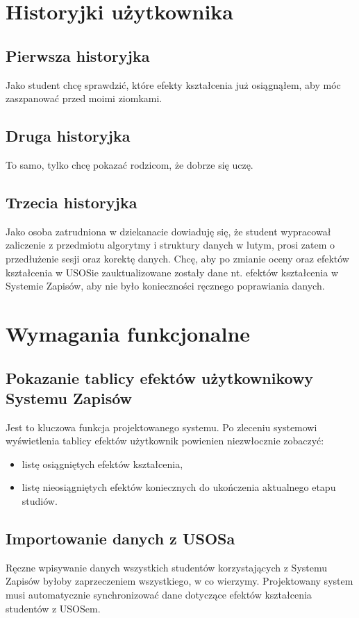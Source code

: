 \documentclass{article}
\begin{document}
\section{Historyjki użytkownika}

\subsection{Pierwsza historyjka}
Jako student chcę sprawdzić, które efekty kształcenia już osiągnąłem, aby móc zaszpanować przed moimi ziomkami.

\subsection{Druga historyjka} %
To samo, tylko chcę pokazać rodzicom, że dobrze się uczę.

\subsection{Trzecia historyjka}
Jako osoba zatrudniona w dziekanacie dowiaduję się, że student wypracował zaliczenie z przedmiotu algorytmy i struktury danych w lutym, prosi zatem o przedłużenie sesji oraz korektę danych. Chcę, aby po zmianie oceny oraz efektów kształcenia w USOSie zauktualizowane zostały dane nt. efektów kształcenia w Systemie Zapisów, aby nie było konieczności ręcznego poprawiania danych.



\section{Wymagania funkcjonalne}

\subsection{Pokazanie tablicy efektów użytkownikowy Systemu Zapisów}
Jest to kluczowa funkcja projektowanego systemu. Po zleceniu systemowi wyświetlenia tablicy efektów użytkownik powienien niezwłocznie zobaczyć:
\begin{itemize}
	\item listę osiągniętych efektów kształcenia,
	\item listę nieosiągniętych efektów koniecznych do ukończenia aktualnego etapu studiów.
\end{itemize}


\subsection{Importowanie danych z USOSa}
Ręczne wpisywanie danych wszystkich studentów korzystających z Systemu Zapisów byłoby zaprzeczeniem wszystkiego, w co wierzymy. Projektowany system musi automatycznie synchronizować dane dotyczące efektów kształcenia studentów z USOSem.
\end{document}
